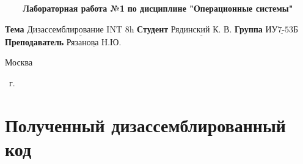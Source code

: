 \documentclass[a4paper,14pt]{article}
\begin{document}
\begin{center}
	\noindent\begin{minipage}{1.3\textwidth}\centering
	\Large\textbf{   ~~~ Лабораторная работа №1}\newline
	\textbf{по дисциплине "Операционные системы"}\newline\newline\newline
	\end{minipage}
\end{center}

\noindent\textbf{Тема} $\underline{\text{Дизассемблирование INT 8h}}$\newline\newline
\noindent\textbf{Студент} $\underline{\text{Рядинский К. В.}}$\newline\newline
\noindent\textbf{Группа} $\underline{\text{ИУ7-53Б}}$\newline\newline
\noindent\textbf{Преподаватель} $\underline{\text{Рязанова Н.Ю.}}$\newline

\begin{center}
	\mbox{}
	\vfill
	Москва
\end{center}

\begin{center}
	\the\year ~г.
\end{center}
\clearpage

\section{Полученный дизассемблированный код}
\end{document}
